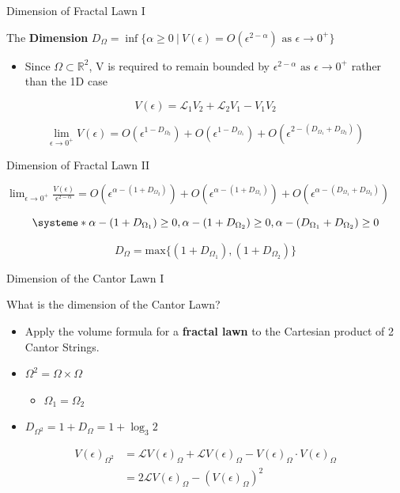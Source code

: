 \documentclass{if-beamer}
\newcommand{\R}{\mathbb{R}}
\newcommand{\SL}{\mathcal{L}}
\newcommand{\Om}{\Omega}
\begin{document}
\begin{frame}{Dimension of Fractal Lawn I}

\begin{definition}
	The {\bf Dimension} $D_{\Om} = \inf\{\alpha \geq 0\ |\ V(\epsilon) = O(\epsilon^{2 - \alpha})\text{ as }\epsilon \to 0^+\}$
\end{definition}
\pause
\begin{itemize}
	\item Since $\Om \subset \R^2$, V is required to remain bounded by $\epsilon^{2-\alpha} \text{ as }\epsilon \to 0^+ $ rather than the 1D case   
\end{itemize}
\pause
\vspace{0.2in}

	\[ V(\epsilon) = \SL_1 V_2 + \SL_2 V_1 - V_1 V_2 \]
	\pause
	
	\[ \lim_{\epsilon \to 0^+} V(\epsilon) = O(\epsilon^{1-D_{\Om_2}}) + O(\epsilon^{1-D_{\Om_1}}) + O(\epsilon^{2-(D_{\Om_1} + D_{\Om_2})})  \]
	
\end{frame}

\begin{frame}{Dimension of Fractal Lawn II}

$\displaystyle \lim_{\epsilon \to 0^+} \frac{V(\epsilon)}{\epsilon^{2-\alpha}} = O(\epsilon^{\alpha - (1+D_{\Om_2})}) + O(\epsilon^{\alpha - (1+D_{\Om_1})}) + O(\epsilon^{\alpha - (D_{\Om_1} + D_{\Om_2})})$
\pause

\[ 
\systeme*{\alpha - (1 + D_{\Om_1}) \geq 0, \alpha - (1 + D_{\Om_2}) \geq 0, \alpha - (D_{\Om_1} + D_{\Om_2}) \geq 0}
\]
\pause

\[ 
D_{\Om} = \text{max} \{ (1 + D_{\Om_1}), (1 + D_{\Om_2}) \}
\]

\end{frame}

\begin{frame}{Dimension of the Cantor Lawn I}

What is the dimension of the Cantor Lawn? \\
\pause
\begin{itemize}
\item Apply the volume formula for a {\bf fractal lawn} to the Cartesian product of 2 Cantor Strings.
\pause 

\item $\Om^2 = \Om \times \Om $
	\pause
	\begin{itemize}
	\item $\Om_1 = \Om_2 $
	\end{itemize}
\pause

\item $D_{\Om^2} = 1 + D_{\Om} = 1 + \log_3 2 $
\end{itemize}
\pause

\begin{align*}
V(\epsilon)_{\Om^2} &= \SL V(\epsilon)_{\Om} + \SL V(\epsilon)_{\Om} - V(\epsilon)_{\Om} \cdot V(\epsilon)_{\Om} \\
&= 2 \SL V(\epsilon)_{\Om} - (V(\epsilon)_{\Om})^2
\end{align*}

\end{frame}
\end{document}
